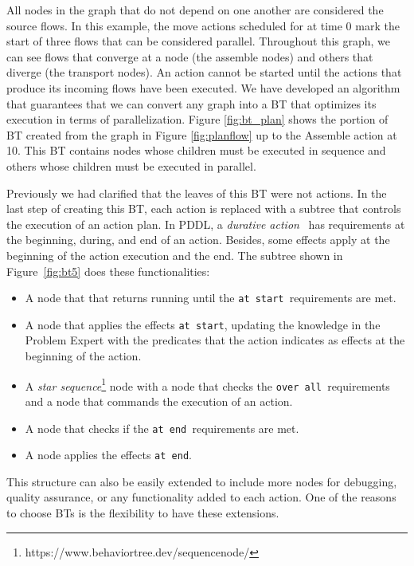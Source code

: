 \documentclass[letterpaper, 10 pt, conference]{IEEEtran}
\begin{document}
All nodes in the graph that do not depend on one another are considered the source flows. In this example, the move actions scheduled for at time 0 mark the start of three flows that can be considered parallel. Throughout this graph, we can see flows that converge at a node (the assemble nodes) and others that diverge (the transport nodes). An action cannot be started until the actions that produce its incoming flows have been executed. We have developed an algorithm \cite{fmartin21}\cite{martin2021optimized} that guarantees that we can convert any graph into a BT that optimizes its execution in terms of parallelization. Figure \ref{fig:bt_plan} shows the portion of BT created from the graph in Figure \ref{fig:planflow} up to the Assemble action at 10. This BT contains nodes whose children must be executed in sequence and others whose children must be executed in parallel.


Previously we had clarified that the leaves of this BT were not actions. In the last step of creating this BT, each action is replaced with a subtree that controls the execution of an action plan. In PDDL, a \emph{durative action}~\cite{fox2003pddl2} has requirements at the beginning, during, and end of an action. Besides, some effects apply at the beginning of the action execution and the end. The subtree shown in Figure~\ref{fig:bt5} does these functionalities:
\begin{itemize}
    \item A node that that returns running until the \small\texttt{at start }\normalsize  requirements are met.
    \item A node that applies the effects \small\texttt{at start}\normalsize, updating the knowledge in the Problem Expert with the predicates that the action indicates as effects at the beginning of the action.
    \item A \emph{star sequence}\footnote{https://www.behaviortree.dev/sequencenode/} node with a node that checks the \small\texttt{over all }\normalsize requirements and a node that commands the execution of an action.
    \item A node that checks if the \small\texttt{at end }\normalsize requirements are met.
    \item A node applies the effects \small\texttt{at end}\normalsize.
\end{itemize}

This structure can also be easily extended to include more nodes for debugging, quality assurance, or any functionality added to each action. One of the reasons to choose BTs is the flexibility to have these extensions.
\end{document}
